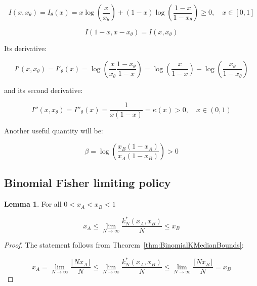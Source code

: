 \documentclass{article}
\theoremstyle{definition}
\newtheorem{lemma}{Lemma}[section]
\begin{document}
\begin{equation}
\label{eq:BinomialRateFunctionI}
    I(x,x_\theta) = I_\theta(x) = x \log \left ( \frac{x}{x_\theta} \right ) +
    (1-x) \log \left ( \frac{1-x}{1-x_\theta} \right )
    \ge 0, \quad x \in [0,1]
\end{equation}

\begin{equation}
\label{eq:BinomialRateFunctionSymmetry}
    I(1-x,x-x_\theta) = I(x,x_\theta)
\end{equation}

Its derivative:

\begin{equation}
\label{eq:BinomialRateFunctionDerivativeI'}
    I'(x,x_\theta) = I'_\theta(x) 
    =
    \log \left (
    \frac{x}{x_\theta} \frac{1-x_\theta}{1-x}
    \right )
    =
    \log \left (
    \frac{x}{1-x}
    \right )
    -
    \log \left (
    \frac{x_\theta}{1-x_\theta}
    \right )
\end{equation}

and its second derivative:

\begin{equation}
\label{eq:BinomialRateFunctionSecondDerivativeI''}
    I''(x,x_\theta) = I''_\theta(x) 
    =
    \frac{1}{x(1-x)}
    =
    \kappa(x)
    > 0, \quad x \in (0,1)
\end{equation}

Another useful quantity will be:

\begin{equation}
\label{eq:beta}
    \beta = \log \left ( \frac{x_B (1-x_A)}{x_A (1-x_B)} \right )
    > 0
\end{equation}

\subsection{Binomial Fisher limiting policy}

\begin{lemma}
For all $0 < x_A < x_B < 1$

    \begin{equation}
        x_A \le 
        \lim_{N \to \infty} \frac{k^*_N(x_A,x_B)}{N}
        \le x_B
    \end{equation}
    
\end{lemma}

\begin{proof}
    The statement follows from Theorem~\ref{thm:BinomialKMedianBounds}:

    \begin{equation}
        x_A
        =
        \lim_{N \to \infty} \frac{\lfloor N x_A \rfloor}{N} 
        \le 
        \lim_{N \to \infty} \frac{k^*_N(x_A,x_B)}{N}
        \le 
        \lim_{N \to \infty} \frac{\lceil N x_B \rceil}{N}
        =
        x_B
\end{equation}
    
\end{proof}
\end{document}
